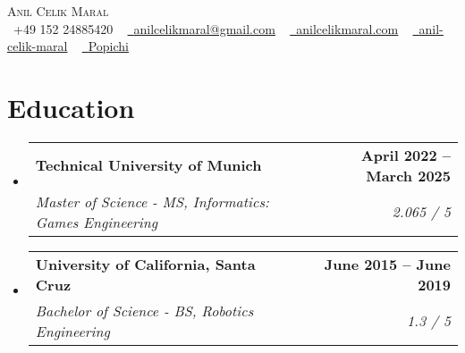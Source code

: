 \documentclass[letterpaper,11pt]{article}
\makeatletter
\newcommand{\resumeSubheading}[4]{
  \vspace{-2pt}\item
    \begin{tabular*}{1.0\textwidth}[t]{l@{\extracolsep{\fill}}r}
      \textbf{#1} & \textbf{\small #2} \\
      \textit{\small#3} & \textit{\small #4} \\
    \end{tabular*}\vspace{-7pt}
}
\newcommand{\resumeSubHeadingListStart}{\begin{itemize}[leftmargin=0.0in, label={}]}
\newcommand{\resumeSubHeadingListEnd}{\end{itemize}}
\makeatother
\begin{document}

\begin{center}
    {\Huge \scshape Anil Celik Maral} \\ \vspace{1pt}
    \vspace{1pt}
    \small \raisebox{-0.1\height}\faPhone\ +49 152 24885420 ~ \href{mailto:anilcelikmaral@gmail.com}{\raisebox{-0.2\height}\faEnvelope\  \underline{anilcelikmaral@gmail.com}} ~ 
    \href{https://anilcelikmaral.com/}{\raisebox{-0.2\height}\faGlobe\ \underline{anilcelikmaral.com}}  ~
    \href{https://www.linkedin.com/in/anil-celik-maral/}{\raisebox{-0.2\height}\faLinkedin\ \underline{anil-celik-maral}}  ~
    \href{https://github.com/Popichi}{\raisebox{-0.2\height}\faGithub\ \underline{Popichi}}
    \vspace{-10pt}  
    
\end{center}


\section{Education}
  \resumeSubHeadingListStart
    \resumeSubheading
      {Technical University of Munich}{April 2022 -- March 2025}
      {Master of Science - MS, Informatics: Games Engineering}{2.065 / 5}
      \resumeSubheading
      {University of California, Santa Cruz}{June 2015 -- June 2019}
      {Bachelor of Science - BS, Robotics Engineering}{1.3 / 5}

  \resumeSubHeadingListEnd

       

\vspace{-16pt}
\end{document}

